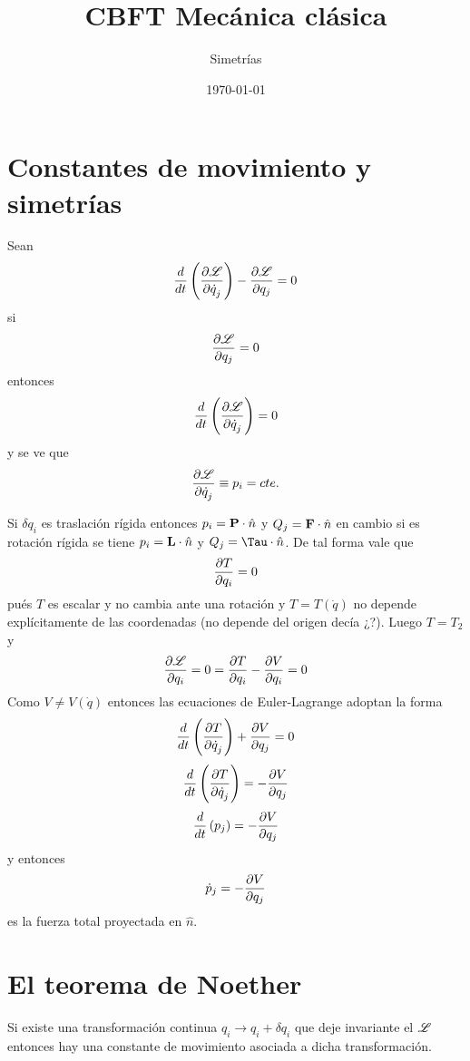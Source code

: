 \documentclass[10pt,oneside]{CBFT_article}
\title{CBFT Mecánica clásica}
\author{Simetrías}
\date{\today}
\begin{document}
\maketitle
\tableofcontents


\section{Constantes de movimiento y simetrías}

Sean 
\[
\frac{d}{dt}\left( \dpar{\Lag}{\dot{q}_j} \right) - \dpar{\Lag}{q_j}  = 0 
\]
si
\[
 \dpar{\Lag}{q_j}  = 0 
\]
entonces 
\[
\frac{d}{dt}\left( \dpar{\Lag}{\dot{q}_j} \right) = 0
\]
y se ve que 
\[
\dpar{\Lag}{\dot{q}_j} \equiv p_i = cte.
\]

Si $\delta q_i$ es traslación rígida entonces $p_i = \vb{P}\cdot\hat{n}$ y $Q_j= \vb{F}\cdot\hat{n}$ en
cambio si es rotación rígida se tiene $p_i = \vb{L}\cdot\hat{n}$ y $Q_j= \vb{\Tau}\cdot\hat{n}$.
De tal forma vale que 
\[
\dpar{T}{q_i} = 0
\]
pués $T$ es escalar y no cambia ante una rotación y $T=T(\dot{q})$ no depende explícitamente de las
coordenadas (no depende del origen decía ¿?). Luego $T=T_2$ y
\[
\dpar{\Lag}{q_i} = 0 = \dpar{T}{q_i} - \dpar{V}{q_i} = 0
\]
Como $V \neq V(\dot{q})$ entonces las ecuaciones de Euler-Lagrange adoptan la forma
\[
\frac{d}{dt}\left( \dpar{T}{\dot{q}_j} \right) + \dpar{V}{q_j}  = 0 
\]
\[
\frac{d}{dt}\left( \dpar{T}{\dot{q}_j} \right) = - \dpar{V}{q_j}   
\]
\[
\frac{d}{dt}\left( p_j \right) = - \dpar{V}{q_j}   
\]
y entonces 
\[
\dot{p}_j = -\dpar{V}{q_j}   
\]
es la fuerza total proyectada en $\hat{n}$.

\section{El teorema de Noether}

Si existe una transformación continua $q_i \longrightarrow q_i + \delta q_i$ que deje invariante el
$\Lag$ entonces hay una constante de movimiento asociada a dicha transformación.
\end{document}
